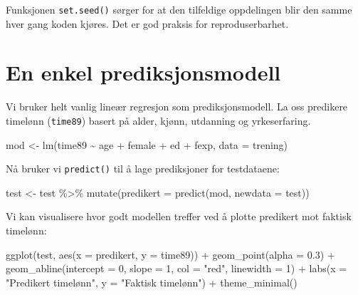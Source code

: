 \documentclass[
  norsk,
  letterpaper,
  DIV=11,
  numbers=noendperiod]{scrreprt}
\newenvironment{Shaded}{\begin{snugshade}}{\end{snugshade}}
\newcommand{\AttributeTok}[1]{\textcolor[rgb]{0.40,0.45,0.13}{#1}}
\newcommand{\DecValTok}[1]{\textcolor[rgb]{0.68,0.00,0.00}{#1}}
\newcommand{\FloatTok}[1]{\textcolor[rgb]{0.68,0.00,0.00}{#1}}
\newcommand{\FunctionTok}[1]{\textcolor[rgb]{0.28,0.35,0.67}{#1}}
\newcommand{\NormalTok}[1]{\textcolor[rgb]{0.00,0.23,0.31}{#1}}
\newcommand{\OtherTok}[1]{\textcolor[rgb]{0.00,0.23,0.31}{#1}}
\newcommand{\SpecialCharTok}[1]{\textcolor[rgb]{0.37,0.37,0.37}{#1}}
\newcommand{\StringTok}[1]{\textcolor[rgb]{0.13,0.47,0.30}{#1}}
\theoremstyle{definition}
\theoremstyle{remark}
\begin{document}
Funksjonen \texttt{set.seed()} sørger for at den tilfeldige oppdelingen
blir den samme hver gang koden kjøres. Det er god praksis for
reproduserbarhet.

\section{En enkel prediksjonsmodell}\label{en-enkel-prediksjonsmodell}

Vi bruker helt vanlig lineær regresjon som prediksjonsmodell. La oss
predikere timelønn (\texttt{time89}) basert på alder, kjønn, utdanning
og yrkeserfaring.

\begin{Shaded}
\begin{Highlighting}[]
\NormalTok{mod }\OtherTok{\textless{}{-}} \FunctionTok{lm}\NormalTok{(time89 }\SpecialCharTok{\textasciitilde{}}\NormalTok{ age }\SpecialCharTok{+}\NormalTok{ female }\SpecialCharTok{+}\NormalTok{ ed }\SpecialCharTok{+}\NormalTok{ fexp, }\AttributeTok{data =}\NormalTok{ trening)}
\end{Highlighting}
\end{Shaded}

Nå bruker vi \texttt{predict()} til å lage prediksjoner for testdataene:

\begin{Shaded}
\begin{Highlighting}[]
\NormalTok{test }\OtherTok{\textless{}{-}}\NormalTok{ test }\SpecialCharTok{\%\textgreater{}\%}
  \FunctionTok{mutate}\NormalTok{(}\AttributeTok{predikert =} \FunctionTok{predict}\NormalTok{(mod, }\AttributeTok{newdata =}\NormalTok{ test))}
\end{Highlighting}
\end{Shaded}

Vi kan visualisere hvor godt modellen treffer ved å plotte predikert mot
faktisk timelønn:

\begin{Shaded}
\begin{Highlighting}[]
\FunctionTok{ggplot}\NormalTok{(test, }\FunctionTok{aes}\NormalTok{(}\AttributeTok{x =}\NormalTok{ predikert, }\AttributeTok{y =}\NormalTok{ time89)) }\SpecialCharTok{+}
  \FunctionTok{geom\_point}\NormalTok{(}\AttributeTok{alpha =} \FloatTok{0.3}\NormalTok{) }\SpecialCharTok{+}
  \FunctionTok{geom\_abline}\NormalTok{(}\AttributeTok{intercept =} \DecValTok{0}\NormalTok{, }\AttributeTok{slope =} \DecValTok{1}\NormalTok{, }\AttributeTok{col =} \StringTok{"red"}\NormalTok{, }\AttributeTok{linewidth =} \DecValTok{1}\NormalTok{) }\SpecialCharTok{+}
  \FunctionTok{labs}\NormalTok{(}\AttributeTok{x =} \StringTok{"Predikert timelønn"}\NormalTok{, }\AttributeTok{y =} \StringTok{"Faktisk timelønn"}\NormalTok{) }\SpecialCharTok{+}
  \FunctionTok{theme\_minimal}\NormalTok{()}
\end{Highlighting}
\end{Shaded}
\end{document}
